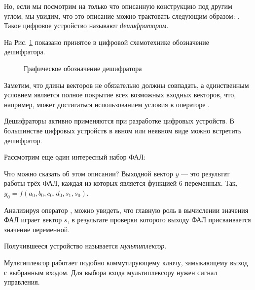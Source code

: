 \par{Но, если мы посмотрим на только что описанную конструкцию под другим углом, мы увидим, что это описание можно трактовать следующим образом: . Такое цифровое устройство называют \emph{дешифратором}.}

\par{На Рис. \ref{fig:decoder} показано принятое в цифровой схемотехнике обозначение дешифратора.}

\begin{figure}[H]
  \centering
  \def\svgwidth{\columnwidth}
  
  \caption{Графическое обозначение дешифратора}
  \label{fig:decoder}
\end{figure}

\par{Заметим, что длины векторов не обязательно должны совпадать, а единственным условием является полное покрытие всех возможных входных векторов, что, например, может достигаться использованием условия  в операторе .}

\par{Дешифраторы активно применяются при разработке цифровых устройств. В большинстве цифровых устройств в явном или неявном виде можно встретить дешифратор.}

\par{Рассмотрим еще один интересный набор ФАЛ:}



\par{Что можно сказать об этом описании? Выходной вектор $y$ — это результат работы трёх ФАЛ, каждая из которых является функцией 6 переменных. Так, $y_0 = f(a_0, b_0, c_0, d_0, s_1, s_0)$.}

\par{Анализируя оператор , можно увидеть, что главную роль в вычислении значения ФАЛ играет вектор $s$, в результате проверки которого выходу ФАЛ присваивается значение  переменной.}

\par{Получившееся устройство называется \emph{мультиплексор}}.

\par{Мультиплексор работает подобно коммутирующему ключу, замыкающему выход с выбранным входом. Для выбора входа мультиплексору нужен сигнал управления. }

